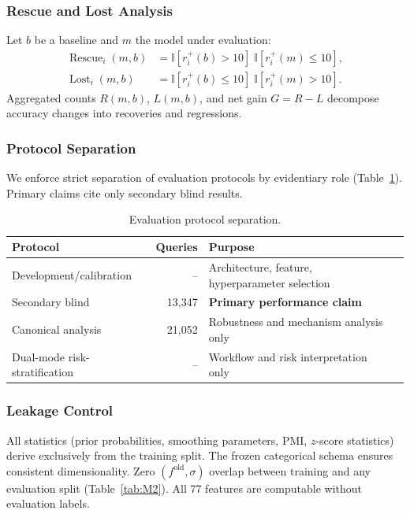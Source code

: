 \documentclass[12pt,letterpaper]{article}
\begin{document}
\subsubsection{Rescue and Lost Analysis}

Let $b$ be a baseline and $m$ the model under evaluation:
%
\begin{align}
\operatorname{Rescue}_i(m,b) &= \mathbb{I}\!\left[r_i^+(b)>10\right]\; \mathbb{I}\!\left[r_i^+(m)\le 10\right], \\
\operatorname{Lost}_i(m,b) &= \mathbb{I}\!\left[r_i^+(b)\le 10\right]\; \mathbb{I}\!\left[r_i^+(m)>10\right].
\end{align}
%
Aggregated counts $R(m,b)$, $L(m,b)$, and net gain $G=R-L$ decompose accuracy changes into recoveries and regressions.

\subsubsection{Protocol Separation}

We enforce strict separation of evaluation protocols by evidentiary role (Table~\ref{tab:M4}). Primary claims cite only secondary blind results.

\begin{table}[ht]
\centering
\caption{Evaluation protocol separation.}
\label{tab:M4}
\begin{tabular}{lrll}
\toprule
Protocol & Queries & Purpose \\
\midrule
Development/calibration & -- & Architecture, feature, hyperparameter selection \\
Secondary blind & 13,347 & \textbf{Primary performance claim} \\
Canonical analysis & 21,052 & Robustness and mechanism analysis only \\
Dual-mode risk-stratification & -- & Workflow and risk interpretation only \\
\bottomrule
\end{tabular}
\end{table}

\subsubsection{Leakage Control}

All statistics (prior probabilities, smoothing parameters, PMI, $z$-score statistics) derive exclusively from the training split. The frozen categorical schema ensures consistent dimensionality. Zero $(f^{\mathrm{old}}, \sigma)$ overlap between training and any evaluation split (Table~\ref{tab:M2}). All 77 features are computable without evaluation labels.
\end{document}
